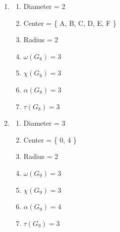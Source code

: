 \documentclass[a4paper]{article}
\begin{document}
\begin{enumerate}
\begin{enumerate}
            \item \begin{enumerate}[label=(\roman*)]
                \item Diameter = 2
                \item Center = \{ A, B, C, D, E, F \}
                \item Radius = 2
                \item $\omega(G_8) = 3$
                \item $\chi(G_8) = 3$
                \item $\alpha(G_8) = 3$
                \item $\tau(G_8) = 3$ \\
            \end{enumerate}

            \item \begin{enumerate}[label=(\roman*)]
                \item Diameter = 3
                \item Center = \{ 0, 4 \}
                \item Radius = 2
                \item $\omega(G_9) = 3$
                \item $\chi(G_9) = 3$
                \item $\alpha(G_9) = 4$
                \item $\tau(G_9) = 3$
            \end{enumerate}
        \end{enumerate}

    \end{enumerate}

\newpage
\end{document}
